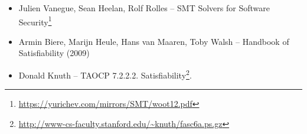 \begin{itemize}

\item Julien Vanegue, Sean Heelan, Rolf Rolles -- SMT Solvers for Software Security\footnote{\url{https://yurichev.com/mirrors/SMT/woot12.pdf}}

\item Armin Biere, Marijn Heule, Hans van Maaren, Toby Walsh -- Handbook of Satisfiability (2009)

\item Donald Knuth -- \ac{TAOCP} 7.2.2.2. Satisfiability\footnote{\url{http://www-cs-faculty.stanford.edu/~knuth/fasc6a.ps.gz}}.

\end{itemize}
